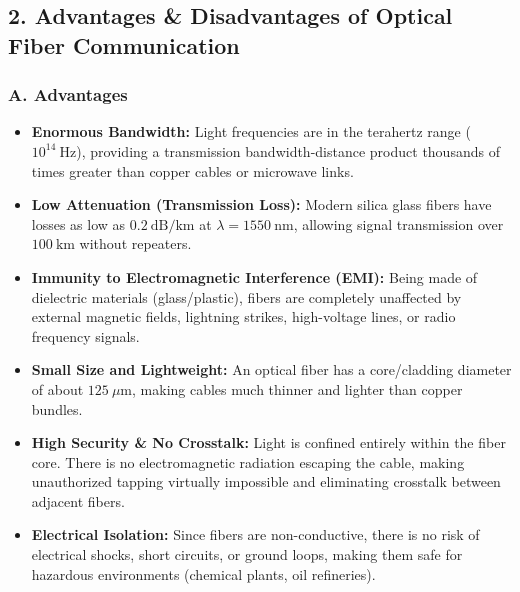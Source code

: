 \subsection{2. Advantages \& Disadvantages of Optical Fiber Communication}

\subsubsection{A. Advantages}
\begin{itemize}
  \item   \textbf{Enormous Bandwidth:} Light frequencies are in the terahertz range ($10^{14}\ \text{Hz}$), providing a transmission bandwidth-distance product thousands of times greater than copper cables or microwave links.
  \item   \textbf{Low Attenuation (Transmission Loss):} Modern silica glass fibers have losses as low as $0.2\ \text{dB/km}$ at $\lambda = 1550\ \text{nm}$, allowing signal transmission over $100\ \text{km}$ without repeaters.
  \item   \textbf{Immunity to Electromagnetic Interference (EMI):} Being made of dielectric materials (glass/plastic), fibers are completely unaffected by external magnetic fields, lightning strikes, high-voltage lines, or radio frequency signals.
  \item   \textbf{Small Size and Lightweight:} An optical fiber has a core/cladding diameter of about $125\ \mu\text{m}$, making cables much thinner and lighter than copper bundles.
  \item   \textbf{High Security \& No Crosstalk:} Light is confined entirely within the fiber core. There is no electromagnetic radiation escaping the cable, making unauthorized tapping virtually impossible and eliminating crosstalk between adjacent fibers.
  \item   \textbf{Electrical Isolation:} Since fibers are non-conductive, there is no risk of electrical shocks, short circuits, or ground loops, making them safe for hazardous environments (chemical plants, oil refineries).
\end{itemize}

